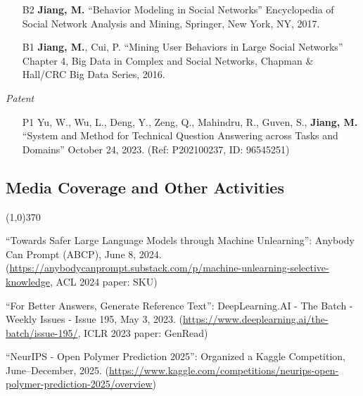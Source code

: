 \documentclass[10pt]{article}
\newenvironment{myindentpar}[1]%
{\begin{list}{}%
         {\setlength{\leftmargin}{#1}}%
         \item[]%
}
{\end{list}}
\newcounter{list}
\begin{document}
\begin{myindentpar}{0.00cm}
\begin{enumerate}[leftmargin=.5cm]
\item[B2] \textbf{Jiang, M.} ``Behavior Modeling in Social Networks'' Encyclopedia of Social Network Analysis and Mining, Springer, New York, NY, 2017.
		
\item[B1] \textbf{Jiang, M.}, Cui, P. ``Mining User Behaviors in Large Social Networks'' Chapter 4, Big Data in Complex and Social Networks, Chapman \& Hall/CRC Big Data Series, 2016.

\end{enumerate}

\hspace{-0.25cm}\textit{Patent}

\begin{enumerate}[leftmargin=.5cm]

\item[P1] Yu, W., Wu, L., Deng, Y., Zeng, Q., Mahindru, R., Guven, S., \textbf{Jiang, M.} ``System and Method for Technical Question Answering across Tasks and Domains'' October 24, 2023. (Ref: P202100237, ID: 96545251)

\end{enumerate}


\end{myindentpar}

\subsection{\sc Media Coverage and Other Activities}
\vspace{-0.4cm} \line(1,0){370} \vspace{-0.1cm}

\begin{myindentpar}{0.75cm}

\hspace{-0.75cm} ``Towards Safer Large Language Models through Machine Unlearning'': Anybody Can Prompt (ABCP), June 8, 2024. (\url{https://anybodycanprompt.substack.com/p/machine-unlearning-selective-knowledge}, ACL 2024 paper: SKU)

\hspace{-0.75cm} ``For Better Answers, Generate Reference Text'': DeepLearning.AI - The Batch - Weekly Issues - Issue 195, May 3, 2023. (\url{https://www.deeplearning.ai/the-batch/issue-195/}, ICLR 2023 paper: GenRead)

\hspace{-0.75cm} ``NeurIPS - Open Polymer Prediction 2025'': Organized a Kaggle Competition, June--December, 2025. (\url{https://www.kaggle.com/competitions/neurips-open-polymer-prediction-2025/overview})


\end{myindentpar}
\end{document}
